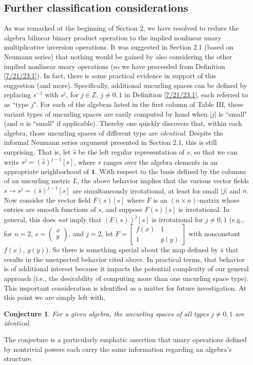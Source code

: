 \documentclass{amsart}
\numberwithin{equation}{section}
\newtheorem*{conjecture}{Conjecture}
\theoremstyle{definition}
\numberwithin{theorem}{section}
\begin{document}
\subsection{Further classification considerations} As was remarked at the beginning of Section 2, we have resolved to reduce the algebra bilinear binary product operation to the implied nonlinear unary multiplicative inversion operations.  It was suggested in Section 2.1 (based on Neumann series) that nothing would be gained by also considering the other implied nonlinear unary operations (so we have proceeded from Definition \ref{7/21/23.1}). In fact, there is some practical evidence in support of this suggestion (and more).  Specifically, additional uncurling spaces can be defined by replacing $s^{-1}$ with $s^j$, for $j\in\mathbb{Z}$, $j\ne 0,1$ in Definition \ref{7/21/23.1}, each referred to as ``type $j$".  For each of the algebras listed in the first column of Table III, these variant types of uncurling spaces are easily computed by hand when  $|j|$ is ``small" (and $n$ is ``small" if applicable).  
Thereby one quickly discovers that, within each algebra, those uncurling spaces of different type are {\it identical}.  Despite the informal Neumann series argument presented in Section 2.1, this is still surprising.  That is, let $\hat{s}$ be the left regular representation of $s$, so that we can write $s^j = (\hat{s})^{j-1}[s]$, where $s$ ranges over the algebra elements in an appropriate neighborhood of $\mathbf{1}$. With respect to the basis defined by the columns of an uncurling metric $L$, the above behavior implies that the various vector fields $s\rightarrow s^j = (\hat{s})^{j-1}[s]$ are simultaneously irrotational, at least for small $|j|$ and $n$.  Now consider the vector field $F(s)[s]$ where $F$ is an \mbox{$(n\times n)$-matrix} whose entries are smooth functions of $s$, and suppose $F(s)[s]$ is \mbox{irrotational}.  In general, this does {\it not} imply that $(F(s))^j[s]$ is irrotational for $j\ne 0,1$ (e.g., for \mbox{$n=2$}, $s=\left(\begin{array}{ccc}
 x   \\ 
y    
\end{array}\right)$, and $j=2$, let $F= \left[\begin{array}{ccc}
 f(x) & 1   \\ 
 1 & g(y)    
\end{array}\right]$ with nonconstant $f(x)$, $g(y)$).  So there is something special about the map defined by $\hat{s}$ that results in the unexpected behavior cited above. 
In practical terms, that behavior is of additional interest because it impacts the potential complexity of our general approach (i.e., the desirability of computing more than one uncurling space type).  This important consideration is identified as a matter for future investigation. At this point we are simply left with,
\begin{conjecture} For a given algebra, the uncurling spaces of all types $j\ne 0,1$ are identical. 
\end{conjecture}
\noindent The conjecture is a particularly emphatic assertion that unary operations defined by nontrivial powers each carry the same information regarding an algebra's structure.  
 
\end{document}
